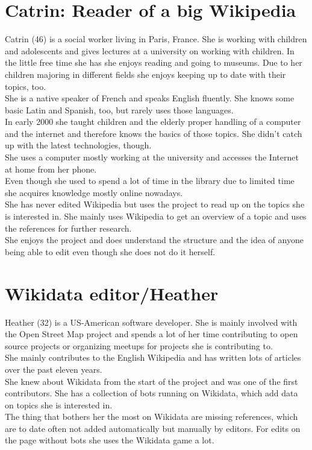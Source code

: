\section{Catrin: Reader of a big Wikipedia}
Catrin (46) is a social worker living in Paris, France. She is working with children and adolescents and gives lectures at a university on working with children. In the little free time she has she enjoys reading and going to museums. Due to her children majoring in different fields she enjoys keeping up to date with their topics, too. \\
She is a native speaker of French and speaks English fluently. She knows some basic Latin and Spanish, too, but rarely uses those languages. \\
In early 2000 she taught children and the elderly proper handling of a computer and the internet and therefore knows the basics of those topics. She didn't catch up with the latest technologies, though. \\
She uses a computer mostly working at the university and accesses the Internet at home from her phone. \\
Even though she used to spend a lot of time in the library due to limited time she acquires knowledge mostly online nowadays. \\
She has never edited Wikipedia but uses the project to read up on the topics she is interested in. She mainly uses Wikipedia to get an overview of a topic and uses the references for further research. \\
She enjoys the project and does understand the structure and the idea of anyone being able to edit even though she does not do it herself. \\


\section{Wikidata editor/Heather}
Heather (32) is a US-American software developer. She is mainly involved with the Open Street Map project and spends a lot of her time contributing to open source projects or organizing meetups for projects she is contributing to. \\
She mainly contributes to the English Wikipedia and has written lots of articles over the past eleven years. \\
She knew about Wikidata from the start of the project and was one of the first contributors. She has a collection of bots running on Wikidata, which add data on topics she is interested in. \\
The thing that bothers her the most on Wikidata are missing references, which are to date often not added automatically but manually by editors. For edits on the page without bots she uses the Wikidata game a lot. 
